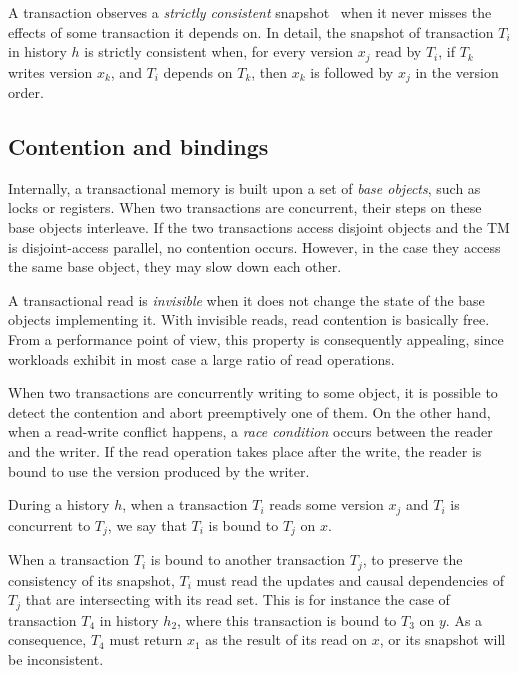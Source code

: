 A transaction observes a \emph{strictly consistent} snapshot~\cite{cc:coh:997} when it never misses the effects of some transaction it depends on.
In detail, the snapshot of transaction $T_i$ in history $h$ is strictly consistent when, for every version $x_j$ read by $T_i$, if $T_k$ writes version $x_k$, and $T_i$ depends on $T_{k}$, then $x_k$ is followed by $x_j$ in the version order.

\subsection{Contention and bindings}

Internally, a transactional memory is built upon a set of \emph{base objects}, such as locks or registers.
When two transactions are concurrent, their steps on these base objects interleave.
If the two transactions access disjoint objects and the TM is disjoint-access parallel, no contention occurs.
However, in the case they access the same base object, they may slow down each other.

A transactional read is \emph{invisible} when it does not change the state of the base objects implementing it.
With invisible reads, read contention is basically free.
From a performance point of view, this property is consequently appealing, since workloads exhibit in most case a large ratio of read operations.

When two transactions are concurrently writing to some object, it is possible to detect the contention and abort preemptively one of them.
On the other hand, when a read-write conflict happens, a \emph{race condition} occurs between the reader and the writer.
If the read operation takes place after the write, the reader is bound to use the version produced by the writer.

\begin{definition}[Binding]
  During a history $h$, when a transaction $T_i$ reads some version $x_j$ and $T_i$ is concurrent to $T_j$, we say that $T_i$ is bound to $T_j$ on $x$.
\end{definition}

When a transaction $T_i$ is bound to another transaction $T_j$, to preserve the consistency of its snapshot, $T_i$ must read the updates and causal dependencies of $T_j$ that are intersecting with its read set.
This is for instance the case of transaction $T_4$ in history $h_2$, where this transaction is bound to $T_3$ on $y$.
As a consequence, $T_4$ must return $x_1$ as the result of its read on $x$, or its snapshot will be inconsistent.

